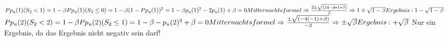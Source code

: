 \documentclass{article}
\begin{document}
				$P{p_u(1)}(S_2<1) = 1-\beta\\\\
				P{p_u(1)}(S_2\leq 0) = 1-\beta\\\\
				(1-P{p_u(1)})^2= 1-\beta\\\\
				p_u(1)^2 - 2p_u(1) +\beta= 0\\\\
				Mitternachtsformel\Rightarrow \frac{2\pm\sqrt{(14-4*1*\beta)}}{2}\\\\
				\Rightarrow 1\pm \sqrt{1-\beta}\\\\
				Ergebnis: 1- \sqrt{1-\beta}\\\\
				$
				$P{p_u(2)}(S_2<2) = 1-\beta\\\\
				P{p_u(2)}(S_2\leq 1) = 1-\beta\\\\
				-p_u(2)^2 +\beta= 0\\\\
				Mitternachtsformel \Rightarrow \frac{\pm\sqrt{(-4(-1)+\beta)}}{-2}\\\\
				\Rightarrow \pm \sqrt{\beta}\\\\
				Ergebnis: + \sqrt{\beta}\\$ 
				Nur ein Ergebnis, da das Ergebnis nicht negativ sein darf!
				
				
				  
\end{document}
